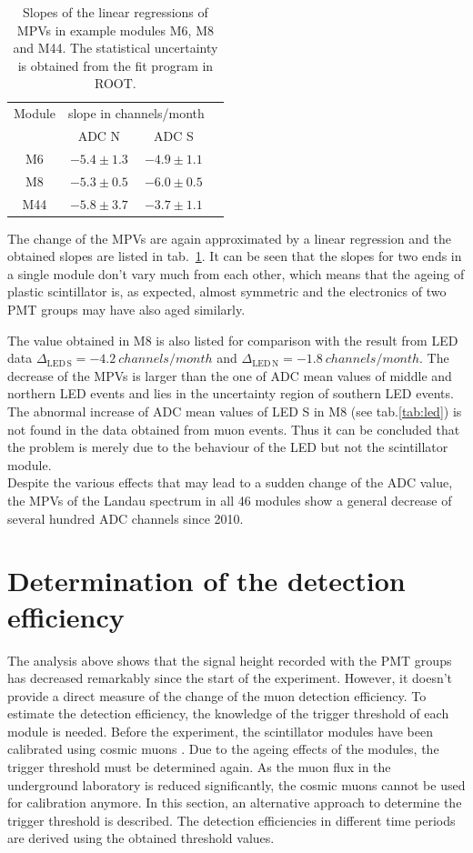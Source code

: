 \begin{table}[hb!]
  \centering
  \caption{Slopes of the linear regressions of MPVs in example modules M6, M8 and M44. The statistical uncertainty is obtained from the fit program in ROOT. }
  \label{tab:mpv}
  \begin{tabular}{c c c c}
  \toprule
  Module & \multicolumn{2}{c}{slope in channels/month} \\
         & ADC N & ADC S \\
  \midrule
  M6  & $-5.4\pm1.3$ & $-4.9\pm1.1$ \\
  M8  & $-5.3\pm0.5$ & $-6.0\pm0.5$ \\
  M44 & $-5.8\pm3.7$ & $-3.7\pm1.1$ \\
  \bottomrule
  \end{tabular}
\end{table}

The change of the MPVs are again approximated by a linear regression and the obtained slopes are listed in tab.\ \ref{tab:mpv}. It can be seen that the slopes for two ends in a single module don't vary much from each other, which means that the ageing of plastic scintillator is, as expected, almost symmetric and the electronics of two PMT groups may have also aged similarly.

The value obtained in M8 is also listed for comparison with the result from LED data $\Delta{}_{\mathrm{LED\,S}}=\SI{-4.2}{channels\per month}$ and $\Delta{}_{\mathrm{LED \,N}}=\SI{-1.8}{channels\per month}$. The decrease of the MPVs is larger than the one of ADC mean values of middle and northern LED events and lies in the uncertainty region of southern LED events. The abnormal increase of ADC mean values of LED S in M8 (see tab.\ref{tab:led}) is not found in the data obtained from muon events. Thus it can be concluded that the problem is merely due to the behaviour of the LED but not the scintillator module. \\
Despite the various effects that may lead to a sudden change of the ADC value, the MPVs of the Landau spectrum in all 46 modules show a general decrease of several hundred ADC channels since 2010.



\section{Determination of the detection efficiency}
The analysis above shows that the signal height recorded with the PMT groups has decreased remarkably since the start of the experiment. However, it doesn't provide a direct measure of the change of the muon detection efficiency. To estimate the detection efficiency, the knowledge of the trigger threshold of each module is needed. Before the experiment, the scintillator modules have been calibrated using cosmic muons \cite{Hab04}. Due to the ageing effects of the modules, the trigger threshold must be determined again. As the muon flux in the underground laboratory is reduced significantly, the cosmic muons cannot be used for calibration anymore. In this section, an alternative approach to determine the trigger threshold is described. The detection efficiencies in different time periods are derived using the obtained threshold values.

